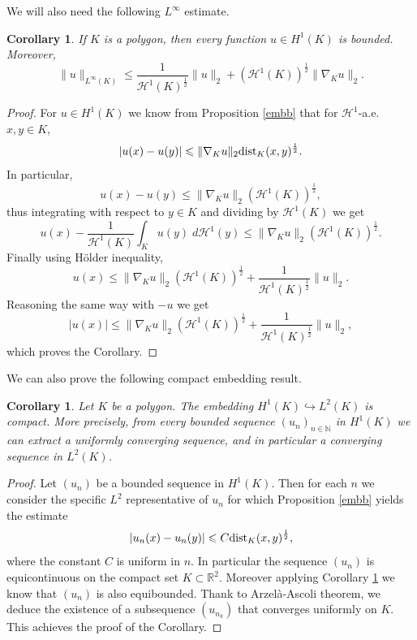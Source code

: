 \documentclass[12pt,english]{smfart} %
\newtheorem{corollary}[theorem]{Corollary}
\theoremstyle{remark}
\newcommand{\R}{\mathbb{R}}
\begin{document}
We will also need the following $L^\infty$ estimate.

\medskip\begin{corollary}\label{bounded} If $K$ is a polygon,  then every function $u\in H^1(K)$ is bounded. Moreover,
$$\|u\|_{L^\infty(K)}\leqslant  \frac{1}{\mathcal{H}^1(K)^\frac{1}{2}}\|u\|_2+  (\mathcal{H}^1(K))^{\frac{1}{2}}\|\nabla_K u\|_2.$$
\end{corollary}

\begin{proof} For $u \in H^1(K)$ we know from Proposition \ref{embb} that for $\mathcal{H}^1$-a.e.\!  $x,y \in K$,
$$|u(x)-u(y)| \leqslant \|\nabla_K u\|_2{\rm dist}_K(x,y)^{\frac{1}{2}} .$$
In particular,
$$u(x)-u(y) \leqslant \|\nabla_K u\|_2 (\mathcal{H}^1(K))^{\frac{1}{2}},$$
thus  integrating with respect to $y \in K$  and dividing by $\mathcal{H}^1(K)$ we get 
$$u(x)-\frac{1}{\mathcal{H}^1(K)}\int_K u(y)  \;d\mathcal{H}^1(y)   \leqslant \|\nabla_K u\|_2 (\mathcal{H}^1(K))^{\frac{1}{2}}.$$
Finally using H\"older inequality,
$$u(x)  \leqslant  \|\nabla_K u\|_2 (\mathcal{H}^1(K))^{\frac{1}{2}} + \frac{1}{\mathcal{H}^1(K)^\frac{1}{2}}\|u\|_2.$$
 Reasoning the same way with $-u$ we get 
$$|u(x)|  \leqslant  \|\nabla_K u\|_2 (\mathcal{H}^1(K))^{\frac{1}{2}} + \frac{1}{\mathcal{H}^1(K)^\frac{1}{2}}\|u\|_2,$$
which proves the Corollary.
\end{proof}
 
We can also prove the following compact embedding result.


\medskip\begin{corollary} \label{compact}Let $K$ be a polygon.  The embedding $H^1(K)\hookrightarrow L^2(K)$ is compact. More precisely, from every bounded sequence $(u_n)_{n\in \mathbb{N}}$ in $H^1(K)$ we can extract a uniformly converging sequence, and in particular a converging sequence in $L^2(K)$.
\end{corollary}

\begin{proof} Let $(u_n)$ be a bounded sequence in $H^1(K)$. Then for each $n$ we consider the specific $L^2$ representative of $u_n$ for which  Proposition \ref{embb}  yields  the  estimate 
$$|u_n(x)-u_n(y)| \leqslant C{\rm dist}_K(x,y)^{\frac{1}{2}},$$
where the constant $C$ is uniform in $n$.  In particular the sequence $(u_n)$ is equicontinuous on the compact set $K\subset \R^2$.  Moreover applying Corollary \ref{bounded} we know that  $(u_n)$ is also equibounded. Thank to Arzel\`a-Ascoli theorem, we deduce the existence of a subsequence $(u_{n_k}) $ that converges uniformly on $K$. This achieves the proof of the Corollary.
\end{proof}
\end{document}
